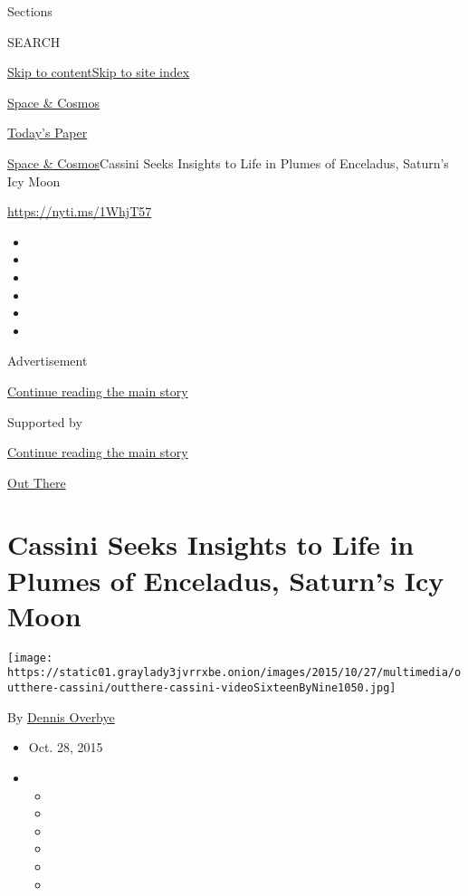 Sections

SEARCH

\protect\hyperlink{site-content}{Skip to
content}\protect\hyperlink{site-index}{Skip to site index}

\href{https://www.nytimes3xbfgragh.onion/section/science/space}{Space \&
Cosmos}

\href{https://myaccount.nytimes3xbfgragh.onion/auth/login?response_type=cookie\&client_id=vi}{}

\href{https://www.nytimes3xbfgragh.onion/section/todayspaper}{Today's
Paper}

\href{/section/science/space}{Space \& Cosmos}\textbar{}Cassini Seeks
Insights to Life in Plumes of Enceladus, Saturn's Icy Moon

\url{https://nyti.ms/1WhjT57}

\begin{itemize}
\item
\item
\item
\item
\item
\item
\end{itemize}

Advertisement

\protect\hyperlink{after-top}{Continue reading the main story}

Supported by

\protect\hyperlink{after-sponsor}{Continue reading the main story}

\href{/column/out-there}{Out There}

\hypertarget{cassini-seeks-insights-to-life-in-plumes-of-enceladus-saturns-icy-moon}{%
\section{Cassini Seeks Insights to Life in Plumes of Enceladus, Saturn's
Icy
Moon}\label{cassini-seeks-insights-to-life-in-plumes-of-enceladus-saturns-icy-moon}}

\texttt{[image: https://static01.graylady3jvrrxbe.onion/images/2015/10/27/multimedia/outthere-cassini/outthere-cassini-videoSixteenByNine1050.jpg]}

By \href{http://www.nytimes3xbfgragh.onion/by/dennis-overbye}{Dennis
Overbye}

\begin{itemize}
\item
  Oct. 28, 2015
\item
  \begin{itemize}
  \item
  \item
  \item
  \item
  \item
  \item
  \end{itemize}
\end{itemize}

